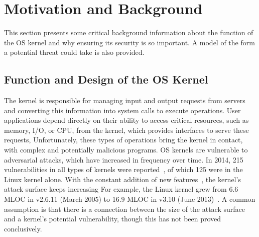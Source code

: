 \section{Motivation and Background}
\label{sec.motivation-and-background}

This section presents some critical background information
about the function of the OS kernel and why ensuring its security is so important.
A model of the form a potential threat could take is also provided.

\subsection{Function and Design of the OS Kernel}


The kernel is responsible for
managing input and output requests from servers and converting this information
into system calls to execute operations. User applications depend directly on
their ability to access critical resources, such as memory, I/O, or CPU, from the
kernel, which provides interfaces to serve these requests, Unfortunately, these
types of operations bring the kernel in contact, with complex and potentially
malicious programs. OS kernels are vulnerable to adversarial attacks, which have
increased in frequency over time.
In 2014, 215 vulnerabilities in all types of kernels were reported~\cite{NVD},
of which 125 were in the Linux kernel alone.
With the constant addition of new features~\cite{Metrics-13}, the kernel's
attack surface keeps increasing For example, the Linux kernel grew from 6.6 MLOC
in v2.6.11 (March 2005) to 16.9 MLOC in v3.10 (June 2013)~\cite{Linux-13}. A
common assumption is that there is a connection between the size of the attack
surface and a kernel's potential vulnerability, though this has not been proved
conclusively.

